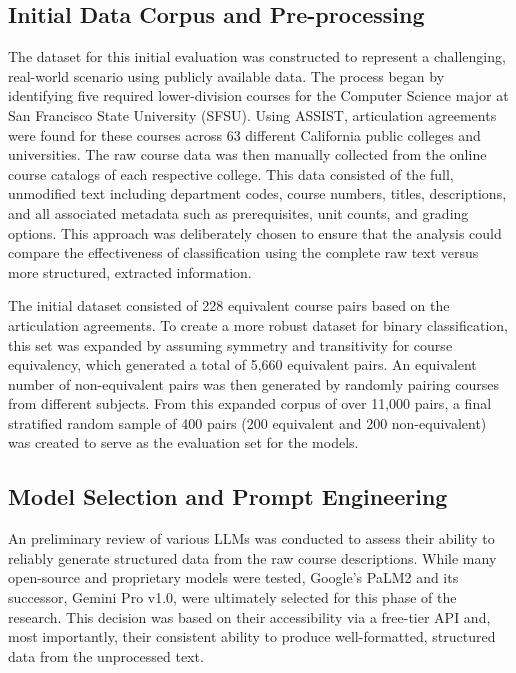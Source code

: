 \subsection{Initial Data Corpus and Pre-processing}\label{ch:3.1.1}
The dataset for this initial evaluation was constructed to represent a challenging, real-world scenario using publicly available data. The process began by identifying five required lower-division courses for the Computer Science major at San Francisco State University (SFSU). Using ASSIST, articulation agreements were found for these courses across 63 different California public colleges and universities. The raw course data was then manually collected from the online course catalogs of each respective college. This data consisted of the full, unmodified text including department codes, course numbers, titles, descriptions, and all associated metadata such as prerequisites, unit counts, and grading options. This approach was deliberately chosen to ensure that the analysis could compare the effectiveness of classification using the complete raw text versus more structured, extracted information.

The initial dataset consisted of 228 equivalent course pairs based on the articulation agreements. To create a more robust dataset for binary classification, this set was expanded by assuming symmetry and transitivity for course equivalency, which generated a total of 5,660 equivalent pairs. An equivalent number of non-equivalent pairs was then generated by randomly pairing courses from different subjects. From this expanded corpus of over 11,000 pairs, a final stratified random sample of 400 pairs (200 equivalent and 200 non-equivalent) was created to serve as the evaluation set for the models.

\subsection{Model Selection and Prompt Engineering}\label{ch:3.1.2}
An preliminary review of various LLMs was conducted to assess their ability to reliably generate structured data from the raw course descriptions. While many open-source and proprietary models were tested, Google's PaLM2 and its successor, Gemini Pro v1.0, were ultimately selected for this phase of the research. This decision was based on their accessibility via a free-tier API and, most importantly, their consistent ability to produce well-formatted, structured data from the unprocessed text.

